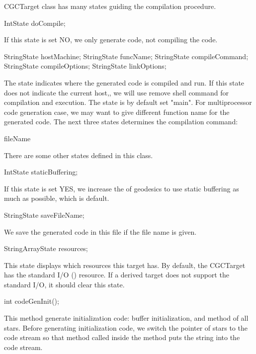 {CGCTarget class has many states guiding the compilation procedure.

\begin{example}
IntState doCompile;
\end{example}

If this state is set NO, we only generate code, not compiling the code.

\begin{example}
StringState hostMachine;
StringState funcName;
StringState compileCommand;
StringState compileOptions;
StringState linkOptions;
\end{example}

The  state indicates where the generated code is compiled
and run. If this state does not indicate the current host,, we will use
remove shell command for compilation and execution. The 
state is by default set "main". For multiprocessor code generation case,
we may want to give different function name for the generated code.
The next three states determines the compilation command:

  fileName 

There are some other states defined in this class.

\begin{example}
IntState staticBuffering;
\end{example}

If this state is set YES, we increase the  of geodesics
to use static buffering as much as possible, which is default.

\begin{example}
StringState saveFileName;
\end{example}

We save the generated code in this file if the file name is given.

\begin{example}
StringArrayState resources;
\end{example}

This state displays which resources this target has. By default, the
CGCTarget has the standard I/O () resource. If a derived
target does not support the standard I/O, it should clear this state.

\begin{example}
int codeGenInit();
\end{example}

This method generate initialization code: buffer initialization, and
 method of all stars. Before generating initialization code,
we switch the  pointer of stars to the  code
stream so that  method called inside the 
method puts the string into the  code stream.

}
